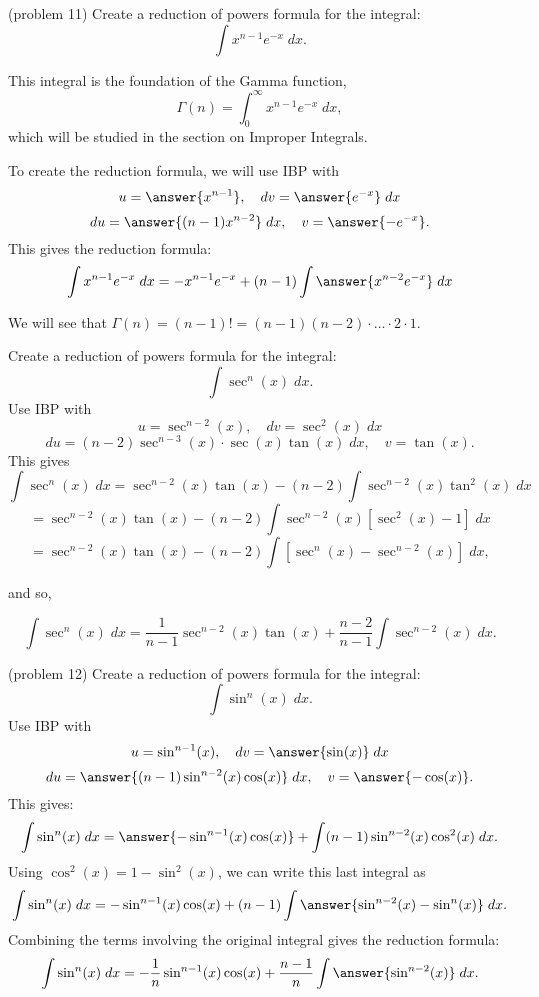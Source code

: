 \documentclass{ximera}
\begin{document}
\begin{problem}(problem 11)
Create a reduction of powers formula for the integral:
\[
\int x^{n-1}e^{-x} \; dx.
\]
\begin{remark}
This integral is the foundation of the Gamma function,
\[
\Gamma(n) = \int_0^\infty x^{n-1}e^{-x} \; dx,
\]
which will be studied in the section on Improper Integrals.
\end{remark}
To create the reduction formula, we will use IBP with
\[
u = \answer{x^{n-1}}, \quad dv = \answer{e^{-x}} \; dx
\]
\[
du = \answer{(n-1)x^{n-2}}\; dx,  \quad v = \answer{-e^{-x}}.
\]
This gives the reduction formula:
\[
\int x^{n-1}e^{-x} \; dx = -x^{n-1}e^{-x} + (n-1)\int \answer{x^{n-2}e^{-x}} \; dx
\]
\begin{remark}
We will see that $\Gamma(n) = (n-1)! = (n-1)(n-2)\cdot \ldots \cdot 2 \cdot 1$.
\end{remark}

\end{problem}




\begin{example}[example 12]
Create a reduction of powers formula for the integral:
\[
\int \sec^n(x) \; dx.
\]
Use IBP with
\[
u = \sec^{n-2}(x), \quad dv = \sec^2(x) \; dx
\]
\[
du = (n-2)\sec^{n-3}(x) \cdot \sec(x)\tan(x)\; dx,  \quad v = \tan(x).
\]
This gives
\[
\int \sec^n(x) \; dx = \sec^{n-2}(x)\tan(x) - (n-2)\int \sec^{n-2}(x)\tan^2(x) \; dx
\]
\[
= \sec^{n-2}(x)\tan(x) - (n-2)\int \sec^{n-2}(x)[\sec^2(x) - 1] \; dx
\]
\[
= \sec^{n-2}(x)\tan(x) - (n-2)\int [\sec^n(x)-\sec^{n-2}(x)]\; dx,
\]

and so,

\[
\int \sec^n(x) \; dx = \frac{1}{n-1}\sec^{n-2}(x)\tan(x) + \frac{n-2}{n-1}\int \sec^{n-2}(x) \; dx.
\]

\end{example}



\begin{problem}(problem 12)
Create a reduction of powers formula for the integral:
\[
\int \sin^n(x) \; dx.
\]
Use IBP with
\[
u = \sin^{n-1}(x), \quad dv = \answer{\sin(x)} \; dx
\]
\[
du = \answer{(n-1)\sin^{n-2}(x) \cos(x)}\; dx,  \quad v = \answer{-\cos(x)}.
\]
This gives:
\[
\int \sin^n(x) \; dx = \answer{-\sin^{n-1}(x)\cos(x)} + \int (n-1)\sin^{n-2}(x) \cos^2(x) \; dx.
\]
Using $\cos^2(x) = 1 -\sin^2(x)$, we can write this last integral as
\[
\int \sin^n(x) \; dx = -\sin^{n-1}(x)\cos(x) + (n-1)\int \answer{\sin^{n-2}(x)- \sin^n(x)} \; dx.
\]
Combining the terms involving the original integral gives the reduction formula:
\[
\int \sin^n(x) \; dx = -\frac{1}{n}\sin^{n-1}(x)\cos(x) + \frac{n-1}{n}\int \answer{\sin^{n-2}(x)} \; dx.
\]

\end{problem}
\end{document}
